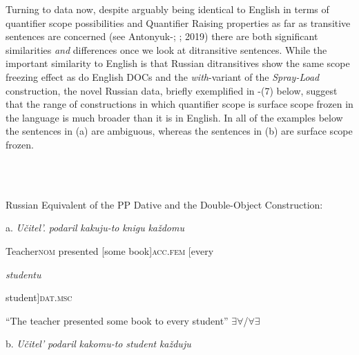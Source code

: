 \documentclass[output=paper,modfonts, nonflat]{langsci/langscibook}
\begin{document}
Turning to data now, despite arguably being identical to English in terms of quantifier scope possibilities and Quantifier Raising properties as far as transitive sentences are concerned (see Antonyuk-\citealt{Yudina2006}; \citealt{Antonyuk2015}; 2019) there are both significant similarities \textit{and} differences once we look at ditransitive sentences. While the important similarity to English is that Russian ditransitives show the same scope freezing effect as do English DOCs and the \textit{with}{}-variant of the \textit{Spray-Load} construction, the novel Russian data, briefly exemplified in -(7) below, suggest that the range of constructions in which quantifier scope is surface scope frozen in the language is much broader than it is in English. In all of the examples below the sentences in (a) are ambiguous, whereas the sentences in (b) are surface scope frozen. 

\ea%
    \label{ex:key:2}
    \gll\\
        \\
    \glt
    \z

         Russian Equivalent of the PP Dative and the Double-Object Construction: 

\begin{styleinnerExample}
a.  \textit{Učitel’.}         \textit{podaril}      \textit{kakuju-to}   \textit{knigu}             \textit{každomu}
\end{styleinnerExample}

\begin{styleinnerExample}
  Teacher\textsc{nom} presented [some   book]\textsc{acc.fem}  [every  
\end{styleinnerExample}

\begin{styleinnerExample}
  \textit{studentu}
\end{styleinnerExample}

\begin{styleinnerExample}
  student]\textsc{dat.msc}\textbf{\textsubscript{} }
\end{styleinnerExample}

\begin{styleinnerExample}
  “The teacher presented some book to every student” ${\exists}{\forall}$/${\forall}{\exists}$
\end{styleinnerExample}

\begin{styleinnerExample}
b.  \textit{Učitel’}          \textit{podaril}      \textit{kakomu-to} \textit{student}     \textit{každuju}
\end{styleinnerExample}
\end{document}

